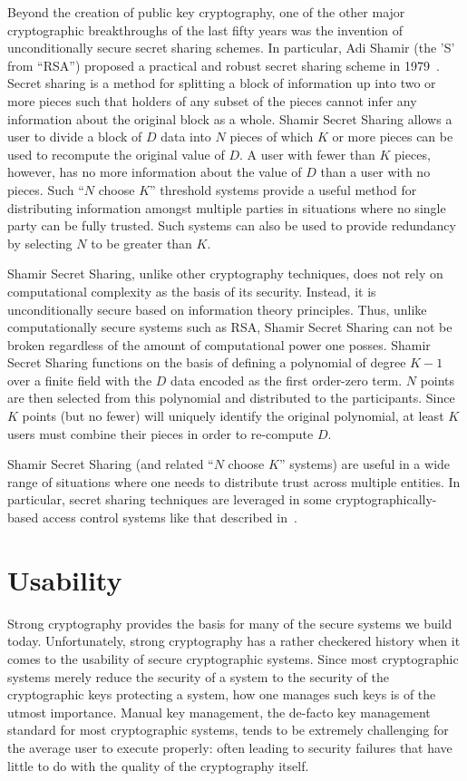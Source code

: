 Beyond the creation of public key cryptography, one of the other major
cryptographic breakthroughs of the last fifty years was the invention
of unconditionally secure secret sharing schemes. In particular, Adi
Shamir (the 'S' from ``RSA'') proposed a practical and robust secret
sharing scheme in 1979~\cite{shamir1979}. Secret sharing is a method
for splitting a block of information up into two or more pieces such
that holders of any subset of the pieces cannot infer any information
about the original block as a whole. Shamir Secret Sharing allows a
user to divide a block of $D$ data into $N$ pieces of which $K$ or
more pieces can be used to recompute the original value of $D$. A user
with fewer than $K$ pieces, however, has no more information about the
value of $D$ than a user with no pieces. Such ``$N$ choose $K$''
threshold systems provide a useful method for distributing information
amongst multiple parties in situations where no single party can be
fully trusted. Such systems can also be used to provide redundancy by
selecting $N$ to be greater than $K$.

Shamir Secret Sharing, unlike other cryptography techniques, does not
rely on computational complexity as the basis of its
security. Instead, it is unconditionally secure based on information
theory principles. Thus, unlike computationally secure systems such as
RSA, Shamir Secret Sharing can not be broken regardless of the amount
of computational power one posses. Shamir Secret Sharing functions on
the basis of defining a polynomial of degree $K-1$ over a finite field
with the $D$ data encoded as the first order-zero term. $N$ points are
then selected from this polynomial and distributed to the
participants. Since $K$ points (but no fewer) will uniquely identify
the original polynomial, at least $K$ users must combine their pieces
in order to re-compute $D$.

Shamir Secret Sharing (and related ``$N$ choose $K$'' systems) are
useful in a wide range of situations where one needs to distribute
trust across multiple entities. In particular, secret sharing
techniques are leveraged in some cryptographically-based access
control systems like that described in~\cite{goyal2006}.

\section{Usability}
\label{chap:background:usability}

Strong cryptography provides the basis for many of the secure systems
we build today. Unfortunately, strong cryptography has a rather
checkered history when it comes to the usability of secure
cryptographic systems. Since most cryptographic systems merely reduce
the security of a system to the security of the cryptographic keys
protecting a system, how one manages such keys is of the utmost
importance. Manual key management, the de-facto key management
standard for most cryptographic systems, tends to be extremely
challenging for the average user to execute properly: often leading to
security failures that have little to do with the quality of the
cryptography itself.

